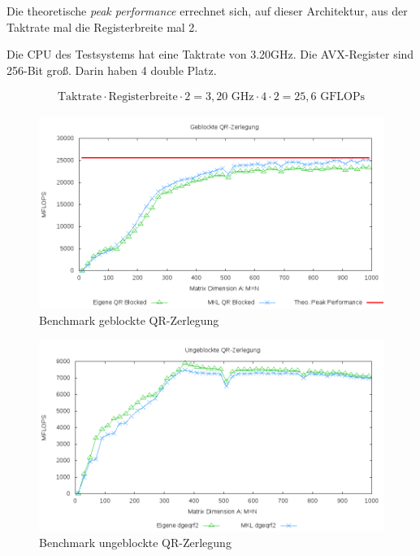 Die theoretische \textit{peak performance} errechnet sich, auf dieser Architektur, aus der Taktrate mal die Registerbreite mal 2. 



Die CPU des Testsystems hat eine Taktrate von 3.20GHz.
Die AVX-Register sind 256-Bit groß. Darin haben 4 double Platz.

\begin{align*}
  \text{Taktrate} \cdot \text{Registerbreite} \cdot 2= 3,20 \text{ GHz} \cdot 4 \cdot 2 = 25,6 \text{ GFLOPs}
\end{align*}

\begin{figure}[H]
  \includegraphics[width=\textwidth]{images/blk.png}
  \caption{Benchmark geblockte QR-Zerlegung}
  \label{img:blk}
\end{figure}

\begin{figure}[H]
  \includegraphics[width=\textwidth]{images/unblk.png}
  \caption{Benchmark ungeblockte QR-Zerlegung}
  \label{img:unblk}
\end{figure}








   
